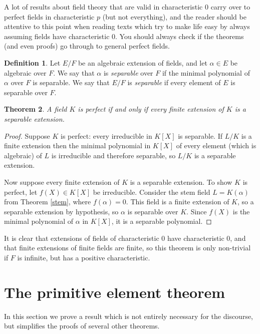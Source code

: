 \documentclass[12pt]{report}
\newtheorem{thm}{Theorem}[section]
\theoremstyle{definition}
\newtheorem{defn}[thm]{Definition}
\def\aa{\alpha}
\begin{document}
A lot of results about field theory that are valid in characteristic 0 carry over to perfect fields in characteristic $p$ (but not everything), and the reader should be attentive to this point when reading texts which try to make life easy by always assuming fields have characteristic 0. You should always check if the theorems (and even proofs) go through to general perfect fields. 

\begin{defn}
    Let $E/F$ be an algebraic extension of fields, and let $\aa \in E$ be algebraic over $F$. We say that $\aa$ is \emph{separable} over $F$ if the minimal polynomial of $\aa$ over $F$ is separable. We say that $E/F$ is \emph{separable} if every element of $E$ is separable over $F$.
\end{defn}


\begin{thm}
    A field $K$ is perfect if and only if every finite extension of $K$ is a separable extension.
\end{thm}

\begin{proof}
    Suppose $K$ is perfect: every irreducible in $K[X]$ is separable. If $L/K$ is a finite extension then the minimal polynomial in $K[X]$ of every element (which is algebraic) of $L$ is irreducible and therefore separable, so $L/K$ is a separable extension.

    Now suppose every finite extension of $K$ is a separable extension. To show $K$ is perfect, let $f(X) \in K[X]$ be irreducible. Consider the stem field $L = K(\aa)$ from Theorem \ref{stem}, where $f(\aa) = 0$. This field is a finite extension of $K$, so a separable extension by hypothesis, so $\aa$ is separable over $K$. Since $f(X)$ is the minimal polynomial of $\aa$ in $K[X]$, it is a separable polynomial.
\end{proof}

It is clear that extensions of fields of characteristic 0 have characteristic 0, and that finite extensions of finite fields are finite, so this theorem is only non-trivial if $F$ is infinite, but has a positive characteristic.

\section{The primitive element theorem}

In this section we prove a result which is not entirely necessary for the discourse, but simplifies the proofs of several other theorems.
\end{document}
